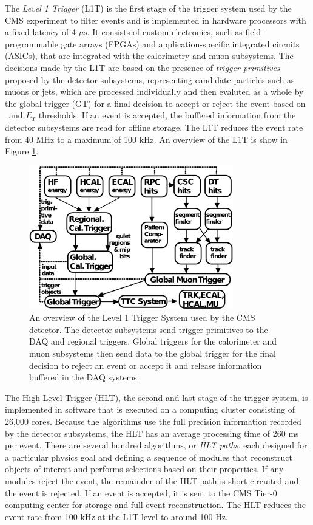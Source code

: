 The \textit{Level 1 Trigger} (L1T) is the first stage of the trigger system used by the CMS experiment to filter events and is implemented in hardware processors with a fixed latency of 4 $\mu\mathrm{s}$. It consists of custom electronics, such as field-programmable gate arrays (FPGAs) and application-specific integrated circuits (ASICs), that are integrated with the calorimetry and muon subsystems. The decisions made by the L1T are based on the presence of \textit{trigger primitives} proposed by the detector subsystems, representing candidate particles such as muons or jets, which are processed individually and then evaluted as a whole by the global trigger (GT) for a final decision to accept or reject the event based on \pT\ and $E_{T}$ thresholds. If an event is accepted, the buffered information from the detector subsystems are read for offline storage. The L1T reduces the event rate from 40 MHz to a maximum of 100 kHz. An overview of the L1T is show in Figure \ref{fig:CMSL1T}.

\begin{figure}[htbp]
  \centering
    \includegraphics[width=3.5in]{images/l1t_overview}
    \caption[Overview of the Level 1 Trigger System]{An overview of the Level 1 Trigger System used by the CMS detector. The detector subsystems send trigger primitives to the DAQ and regional triggers. Global triggers for the calorimeter and muon subsystems then send data to the global trigger for the final decision to reject an event or accept it and release information buffered in the DAQ systems.\cite{CMSTRIDAS}}
    \label{fig:CMSL1T}
\end{figure}

The High Level Trigger (HLT), the second and last stage of the trigger system, is implemented in software that is executed on a computing cluster consisting of 26,000 cores. Because the algorithms use the full precision information recorded by the detector subsystems, the HLT has an average processing time of 260 ms per event.\cite{CMSHLT} There are several hundred algorithms, or \textit{HLT paths}, each designed for a particular physics goal and defining a sequence of modules that reconstruct objects of interest and performs selections based on their properties. If any modules reject the event, the remainder of the HLT path is short-circuited and the event is rejected. If an event is accepted, it is sent to the CMS Tier-0 computing center for storage and full event reconstruction. The HLT reduces the event rate from 100 kHz at the L1T level to around 100 Hz.

